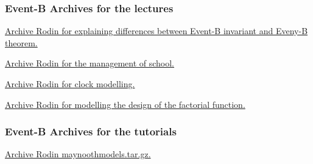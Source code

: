 \documentclass[ 12pt]{article}
\begin{document}
\subsubsection{Event-B Archives for the  lectures}

 \href{http://mery54.github.io/teaching/mosos/lecturesnotes/
   ex-safety.zip}{Archive Rodin  for  explaining differences between
   Event-B invariant and Eveny-B theorem. }


 
 \href{http://mery54.github.io/teaching/mosos/models/
   ex-school.zip}{Archive Rodin  for   the management of school. }

 
 
 \href{http://mery54.github.io/teaching/mosos/models/clock-tut0.zip}{Archive Rodin  for  clock modelling. }

  \href{http://mery54.github.io/teaching/mosos/lecturesnotes/factorial-plugin-tutO.zip}{Archive Rodin  for   modelling  the 
   design of the factorial function.}
  


 \subsubsection{Event-B Archives for   the tutorials}
\label{sec:event-b-archives}



\href{http://mery54.github.io/teaching/mosos/models/maynoothmodels.tar.gz}{Archive
  Rodin  maynoothmodels.tar.gz.}

\hrulefill







\end{document}
